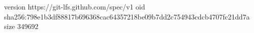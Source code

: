 version https://git-lfs.github.com/spec/v1
oid sha256:798e1b3df88817b696368cac64357218be09b7dd2c754943cdcb4707fc21dd7a
size 349692
